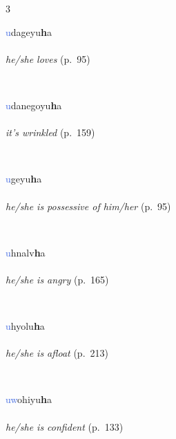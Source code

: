 \documentclass[oneside,openany]{book}%
\begin{document}
\noindent\begin{multicols}{3}%
\begin{minipage}[t]{\linewidth}
\raggedright\noindent \textcolor{RoyalBlue}{u}dageyu\textbf{h}a\\
\\
\noindent \textit{he/she loves} (p.~95)
\end{minipage}\\[1em]%
\begin{minipage}[t]{\linewidth}
\raggedright\noindent \textcolor{RoyalBlue}{u}danegoyu\textbf{h}a\\
\\
\noindent \textit{it's wrinkled} (p.~159)
\end{minipage}\\[1em]%
\begin{minipage}[t]{\linewidth}
\raggedright\noindent \textcolor{RoyalBlue}{u}geyu\textbf{h}a\\
\\
\noindent \textit{he/she is possessive of him/her} (p.~95)
\end{minipage}\\[1em]%
\begin{minipage}[t]{\linewidth}
\raggedright\noindent \textcolor{RoyalBlue}{u}hnalv\textbf{h}a\\
\\
\noindent \textit{he/she is angry} (p.~165)
\end{minipage}\\[1em]%
\begin{minipage}[t]{\linewidth}
\raggedright\noindent \textcolor{RoyalBlue}{u}hyolu\textbf{h}a\\
\\
\noindent \textit{he/she is afloat} (p.~213)
\end{minipage}\\[1em]%
\begin{minipage}[t]{\linewidth}
\raggedright\noindent \textcolor{RoyalBlue}{uw}ohiyu\textbf{h}a\\
\\
\noindent \textit{he/she is confident} (p.~133)
\end{minipage}\\[1em]%
\end{multicols}%
\vspace{1em}%
\needspace{3in}%
\end{document}
